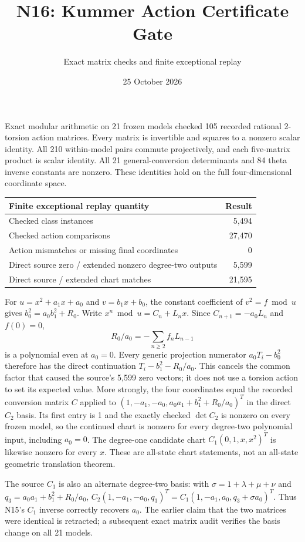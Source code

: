 \documentclass[11pt]{article}
\title{N16: Kummer Action Certificate Gate}
\author{Exact matrix checks and finite exceptional replay}
\date{25 October 2026}
\begin{document}
\maketitle
\noindent Exact modular arithmetic on 21 frozen models checked 105 recorded
rational 2-torsion action matrices. Every matrix is invertible and squares
to a nonzero scalar identity. All 210 within-model pairs commute
projectively, and each five-matrix product is scalar identity. All 21
general-conversion determinants and 84 theta inverse constants are nonzero.
These identities hold on the full four-dimensional coordinate space.

\begin{center}\small
\begin{tabular}{lr}
\toprule
Finite exceptional replay quantity & Result\\
\midrule
Checked class instances & 5,494\\
Checked action comparisons & 27,470\\
Action mismatches or missing final coordinates & 0\\
Direct source zero / extended nonzero degree-two outputs & 5,599\\
Direct source / extended chart matches & 21,595\\
\bottomrule
\end{tabular}
\end{center}

\noindent For $u=x^2+a_1x+a_0$ and $v=b_1x+b_0$, the constant coefficient
of $v^2=f\bmod u$ gives $b_0^2=a_0b_1^2+R_0$. Write
$x^n\bmod u=C_n+L_nx$. Since $C_{n+1}=-a_0L_n$ and $f(0)=0$,
\[
 R_0/a_0=-\sum_{n\ge2}f_nL_{n-1}
\]
is a polynomial even at $a_0=0$. Every generic projection numerator
$a_0T_i-b_0^2$ therefore has the direct continuation
$T_i-b_1^2-R_0/a_0$. This cancels the common factor that caused the
source's 5,599 zero vectors; it does not use a torsion action to set its
expected value. More strongly, the four coordinates equal the recorded
conversion matrix $C$ applied to
$(1,-a_1,-a_0,a_0a_1+b_1^2+R_0/a_0)^T$ in the direct $C_2$ basis. Its first entry is 1 and
the exactly checked $\det C_2$ is nonzero on every frozen model, so the
continued chart is nonzero for every degree-two polynomial input, including
$a_0=0$. The degree-one candidate chart $C_1(0,1,x,x^2)^T$ is likewise
nonzero for every $x$. These are all-state chart statements, not an
all-state geometric translation theorem.

\noindent The source $C_1$ is also an alternate degree-two basis:
with $\sigma=1+\lambda+\mu+\nu$ and $q_3=a_0a_1+b_1^2+R_0/a_0$,
$C_2(1,-a_1,-a_0,q_3)^T=C_1(1,-a_1,a_0,q_3+\sigma a_0)^T$.
Thus N15's $C_1$ inverse correctly recovers $a_0$. The earlier claim
that the two matrices were identical is retracted; a subsequent exact
matrix audit verifies the basis change on all 21 models.
\end{document}
